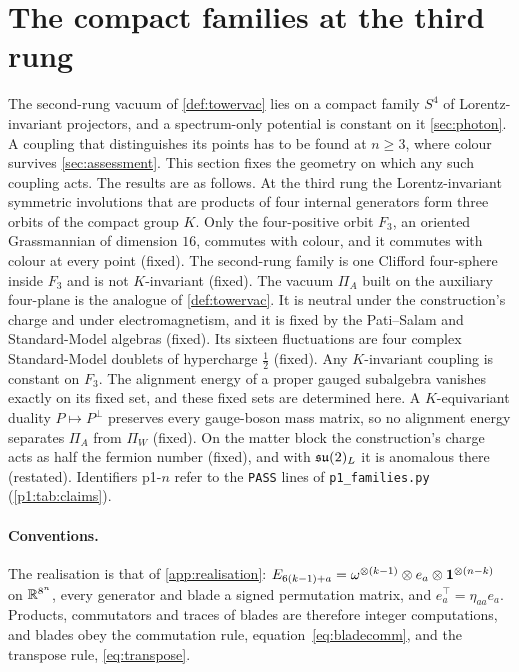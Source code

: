 \section{The compact families at the third rung}
\label{p1:sec:main}

The second-rung vacuum of \cref{def:towervac} lies on a compact family $S^4$ of Lorentz-invariant projectors, and a spectrum-only
potential is constant on it \cref{sec:photon}. A coupling that distinguishes its points has to be found at $n\ge3$, where colour survives
\cref{sec:assessment}. This section fixes the geometry on which any such coupling acts. The results are as follows. At the third rung the
Lorentz-invariant symmetric involutions that are products of four internal generators form three orbits of the compact group $K$. Only the
four-positive orbit $F_3$, an oriented Grassmannian of dimension $16$, commutes with colour, and it commutes with colour at every point
(fixed). The second-rung family is one Clifford four-sphere inside $F_3$ and is not $K$-invariant (fixed). The vacuum $\Pi_A$ built on the
auxiliary four-plane is the analogue of \cref{def:towervac}. It is neutral under the construction's charge and under electromagnetism, and
it is fixed by the Pati--Salam and Standard-Model algebras (fixed). Its sixteen fluctuations are four complex Standard-Model doublets of
hypercharge $\tfrac12$ (fixed). Any $K$-invariant coupling is constant on $F_3$. The alignment energy of a proper gauged subalgebra vanishes
exactly on its fixed set, and these fixed sets are determined here. A $K$-equivariant duality $P\mapsto P^\perp$ preserves every gauge-boson
mass matrix, so no alignment energy separates $\Pi_A$ from $\Pi_W$ (fixed). On the matter block the construction's charge acts as half the
fermion number (fixed), and with $\mathfrak{su}(2)_L$ it is anomalous there (restated). Identifiers p1-$n$ refer to the \texttt{PASS} lines of
\texttt{p1\_families.py} (\cref{p1:tab:claims}).

\paragraph{Conventions.} The realisation is that of \cref{app:realisation}: $E_{6(k-1)+a}=\omega^{\otimes(k-1)}\otimes e_a\otimes\mathbf 1^{\otimes(n-k)}$ on
$\mathbb{R}^{8^n}$, every generator and blade a signed permutation matrix, and $e_a^{\!\top}=\eta_{aa}e_a$. Products, commutators and traces of blades are therefore integer
computations, and blades obey the commutation rule, equation~\cref{eq:bladecomm}, and the transpose rule, \eqref{eq:transpose}.

